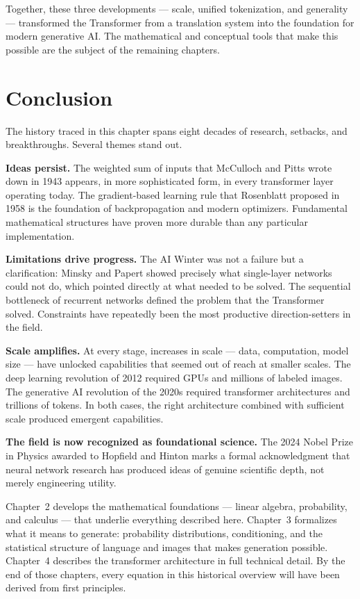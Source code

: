 \documentclass{book}
\begin{document}
Together, these three developments --- scale, unified tokenization, and
generality --- transformed the Transformer from a translation system into the
foundation for modern generative AI. The mathematical and conceptual tools
that make this possible are the subject of the remaining chapters.

\section{Conclusion}

The history traced in this chapter spans eight decades of research,
setbacks, and breakthroughs. Several themes stand out.

\textbf{Ideas persist.} The weighted sum of inputs that McCulloch and Pitts
wrote down in 1943 appears, in more sophisticated form, in every transformer
layer operating today. The gradient-based learning rule that Rosenblatt
proposed in 1958 is the foundation of backpropagation and modern optimizers.
Fundamental mathematical structures have proven more durable than any
particular implementation.

\textbf{Limitations drive progress.} The AI Winter was not a failure but a
clarification: Minsky and Papert showed precisely what single-layer networks
could not do, which pointed directly at what needed to be solved. The
sequential bottleneck of recurrent networks defined the problem that the
Transformer solved. Constraints have repeatedly been the most productive
direction-setters in the field.

\textbf{Scale amplifies.} At every stage, increases in scale --- data,
computation, model size --- have unlocked capabilities that seemed out of
reach at smaller scales. The deep learning revolution of 2012 required
GPUs and millions of labeled images. The generative AI revolution of the
2020s required transformer architectures and trillions of tokens. In both
cases, the right architecture combined with sufficient scale produced
emergent capabilities.

\textbf{The field is now recognized as foundational science.} The 2024
Nobel Prize in Physics awarded to Hopfield and Hinton marks a formal
acknowledgment that neural network research has produced ideas of genuine
scientific depth, not merely engineering utility.

Chapter~2 develops the mathematical foundations --- linear algebra,
probability, and calculus --- that underlie everything described here.
Chapter~3 formalizes what it means to generate: probability distributions,
conditioning, and the statistical structure of language and images that
makes generation possible. Chapter~4 describes the transformer architecture
in full technical detail. By the end of those chapters, every equation
in this historical overview will have been derived from first principles.
\end{document}
